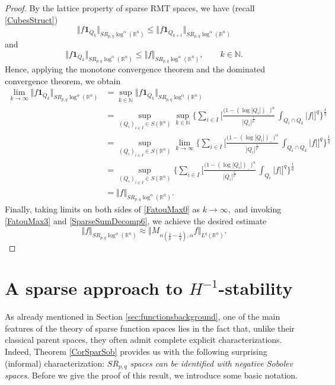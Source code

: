 \documentclass[11pt, a4paper,leqno]{amsart}
\theoremstyle{plain}
\numberwithin{equation}{section}
\theoremstyle{definition}
\theoremstyle{remark}
\begin{document}
\begin{proof}
By the lattice property of sparse RMT spaces, we have (recall
\eqref{CubesStruct})
\[
\Vert f\mathbf{1}_{Q_{k}}\Vert_{SR_{p,q}\log^{\alpha}(\mathbb{R}^{n})}%
\leq\Vert f\mathbf{1}_{Q_{k+1}}\Vert_{SR_{p,q}\log^{\alpha}(\mathbb{R}^{n})}%
\]
and
\[
\Vert f\mathbf{1}_{Q_{k}}\Vert_{SR_{p,q}\log^{\alpha}(\mathbb{R}^{n})}%
\leq\Vert f\Vert_{SR_{p,q}\log^{\alpha}(\mathbb{R}^{n})},\qquad k\in
\mathbb{N}.
\]
Hence, applying the monotone convergence theorem and the dominated convergence
theorem, we obtain
\begin{align}
\lim_{k\rightarrow\infty}\Vert f\mathbf{1}_{Q_{k}}\Vert_{SR_{p,q}\log^{\alpha
}(\mathbb{R}^{n})}  &  =\sup_{k\in\mathbb{N}}\Vert f\mathbf{1}_{Q_{k}}%
\Vert_{SR_{p,q}\log^{\alpha}(\mathbb{R}^{n})}\nonumber\\
&  =\sup_{(Q_{i})_{i\in I}\in S(\mathbb{R}^{n})}\sup
_{k\in\mathbb{N}}\bigg\{\sum_{i\in I}\bigg[\frac{\big(1-(\log|Q_{i}%
|)_{-}\big)^{\alpha}}{|Q_{i}|^{\frac{1}{p^{\prime}}}}\,\int_{Q_{i}\cap Q_{k}%
}|f|\bigg]^{q}\bigg\}^{\frac{1}{q}}\nonumber\\
&  =\sup_{(Q_{i})_{i\in I}\in S(\mathbb{R}^{n})}\lim
_{k\rightarrow\infty}\bigg\{\sum_{i\in I}\bigg[\frac{\big(1-(\log|Q_{i}%
|)_{-}\big)^{\alpha}}{|Q_{i}|^{\frac{1}{p^{\prime}}}}\,\int_{Q_{i}\cap Q_{k}%
}|f|\bigg]^{q}\bigg\}^{\frac{1}{q}}\label{SparseSumDecomp6}\\
&  =\sup_{(Q_{i})_{i\in I}\in S(\mathbb{R}^{n})}\bigg\{\sum
_{i\in I}\bigg[\frac{\big(1-(\log|Q_{i}|)_{-}\big)^{\alpha}}{|Q_{i}|^{\frac
{1}{p^{\prime}}}}\,\int_{Q_{i}}|f|\bigg]^{q}\bigg\}^{\frac{1}{q}}\nonumber\\
&  =\Vert f\Vert_{SR_{p,q}\log^{\alpha}(\mathbb{R}^{n}%
)}.\nonumber
\end{align}
Finally, taking limits on both sides of \eqref{FatouMax0} as $k\rightarrow
\infty,$ and invoking \eqref{FatouMax3} and \eqref{SparseSumDecomp6}, we
achieve the desired estimate
\[
\Vert f\Vert_{SR_{p,q}\log^{\alpha}(\mathbb{R}^{n})}\approx\Vert M_{n(\frac
{1}{p}-\frac{1}{q}),\alpha}f\Vert_{L^{q}(\mathbb{R}^{n})}.
\]

\end{proof}

\section{A sparse approach to $H^{-1}$-stability\label{Section1.3}}


As already mentioned in Section \ref{sec:functionsbackground}, one of the main features of the theory of sparse function spaces lies in the
fact that, unlike their classical parent spaces, they often admit complete
explicit characterizations. Indeed, Theorem \ref{CorSparSob}  provides
us with the following surprising (informal) characterization: \emph{$SR_{p,q}$
spaces can be identified with negative Sobolev spaces}. Before we give the
proof of this result, we introduce some basic notation.
\end{document}
